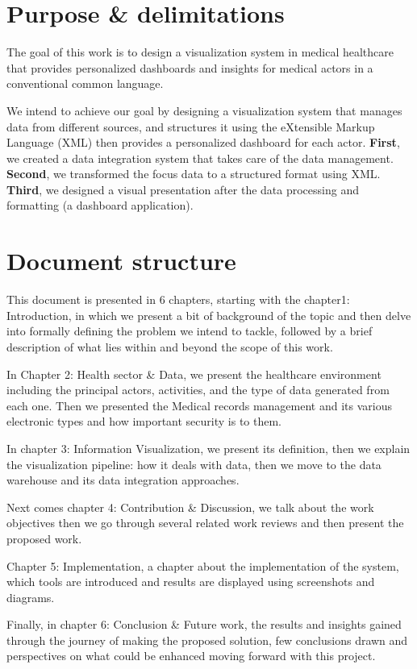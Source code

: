 \section{Purpose \& delimitations}

The goal of this work is to design a visualization system in medical healthcare that provides personalized dashboards and insights for medical actors in a conventional common language.
 
We intend to achieve our goal by designing a visualization system that manages data from different sources, and structures it using the eXtensible Markup Language (XML) then provides a personalized dashboard for each actor.
 \newline
 \textbf{First}, we created a data integration system that takes care of the data management.\newline 
 \textbf{Second}, we transformed the focus data to a structured format using XML.\newline
 \textbf{Third}, we designed a visual presentation after the data processing and formatting (a dashboard application).

 
\section{Document structure}
This document is presented in 6 chapters, starting with the chapter1: Introduction, in which we present a bit of background of the topic and then delve into formally defining the problem we intend to tackle, followed by a brief description of what lies within and beyond the scope of this work.
 
In Chapter 2: Health sector \& Data, we present the healthcare environment including the principal actors, activities, and the type of data generated from each one. Then we presented the Medical records management and its various electronic types and how important security is to them.
 
In chapter 3: Information Visualization, we present its definition, then we explain the visualization pipeline: how it deals with data, then we move to the data warehouse and its data integration approaches.
 
 Next comes chapter 4: Contribution \& Discussion, we talk about the work objectives then we go through several related work reviews and then present the proposed work. 
 
 Chapter 5: Implementation, a chapter about the implementation of the system, which tools are introduced and results are displayed using screenshots and diagrams.
 
Finally, in chapter 6: Conclusion \& Future work, the results and insights gained through the journey of making the proposed solution, few conclusions drawn and perspectives on what could be enhanced moving forward with this project.
